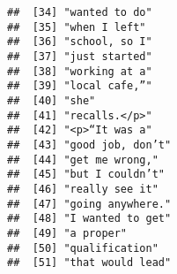 \documentclass[]{article}
\begin{document}
\begin{verbatim}
##  [34] "wanted to do"                                                                                                                             
##  [35] "when I left"                                                                                                                              
##  [36] "school, so I"                                                                                                                             
##  [37] "just started"                                                                                                                             
##  [38] "working at a"                                                                                                                             
##  [39] "local cafe,”"                                                                                                                             
##  [40] "she"                                                                                                                                      
##  [41] "recalls.</p>"                                                                                                                             
##  [42] "<p>“It was a"                                                                                                                             
##  [43] "good job, don’t"                                                                                                                          
##  [44] "get me wrong,"                                                                                                                            
##  [45] "but I couldn’t"                                                                                                                           
##  [46] "really see it"                                                                                                                            
##  [47] "going anywhere."                                                                                                                          
##  [48] "I wanted to get"                                                                                                                          
##  [49] "a proper"                                                                                                                                 
##  [50] "qualification"                                                                                                                            
##  [51] "that would lead"                                                                                                                          

\end{verbatim}
\end{document}

